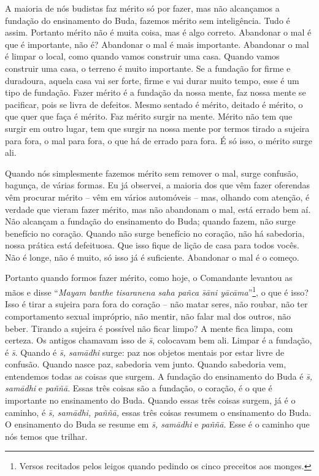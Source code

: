 A maioria de nós budistas faz mérito só por fazer, mas não
alcançamos a fundação do ensinamento do Buda, fazemos mérito sem
inteligência. Tudo é assim. Portanto mérito não é muita coisa, mas é
algo correto. Abandonar o mal é que é importante, não é? Abandonar o
mal é mais importante. Abandonar o mal é limpar o local, como quando
vamos construir uma casa. Quando vamos construir uma casa, o terreno é
muito importante. Se a fundação for firme e duradoura, aquela casa vai
ser forte, firme e vai durar muito tempo, esse é um tipo de fundação.
Fazer mérito é a fundação da nossa mente, faz nossa mente se pacificar,
pois se livra de defeitos. Mesmo sentado é mérito, deitado é mérito, o
que quer que faça é mérito. Faz mérito surgir na mente. Mérito não tem
que surgir em outro lugar, tem que surgir na nossa mente por termos
tirado a sujeira para fora, o mal para fora, o que há de errado para
fora. É só isso, o mérito surge ali. 

Quando nós simplesmente fazemos mérito sem remover o mal, surge
confusão, bagunça, de várias formas. Eu já observei, a maioria dos que
vêm fazer oferendas vêm procurar mérito – vêm em vários automóveis –
mas, olhando com atenção, é verdade que vieram fazer mérito, mas não
abandonam o mal, está errado bem aí. Não alcançam a fundação do
ensinamento do Buda; quando fazem, não surge benefício no coração.
Quando não surge benefício no coração, não há sabedoria, nossa prática
está defeituosa. Que isso fique de lição de casa para todos vocês. Não
é longe, não é muito, só isso já é suficiente. Abandonar o mal é o
começo.

Portanto quando formos fazer mérito, como hoje, o Comandante
levantou as mãos e disse “\textit{Mayam banthe tisaranena saha pañca
s\=\il\=ani y\=ac\=ama}”\footnote{Versos recitados pelos leigos quando
pedindo os cinco preceitos aos monges. }, o que é isso? Isso é tirar a
sujeira para fora do coração – não matar seres, não
roubar, não ter comportamento sexual impróprio, não mentir, não falar
mal dos outros, não beber. Tirando a sujeira é possível não ficar
limpo? A mente fica limpa, com certeza. Os antigos chamavam isso de
\textit{s\=\ila}, colocavam bem ali. Limpar é a fundação, é
\textit{s\=\ila}. Quando é \textit{s\=\ila, sam\=adhi} surge: paz nos
objetos mentais por estar livre de confusão. Quando nasce paz,
sabedoria vem junto. Quando sabedoria vem, entendemos todas as coisas
que surgem. A fundação do ensinamento do Buda é \textit{s\=\ila,
sam\=adhi }e\textit{ paññ\=a}. Essas três coisas são a fundação, o
coração, é o que é importante no ensinamento do Buda. Quando essas três
coisas surgem, já é o caminho, é \textit{s\=\ila, sam\=adhi, paññ\=a,}
essas três coisas resumem o ensinamento do Buda. O ensinamento do Buda
se resume em \textit{s\=\ila, sam\=adhi }e\textit{ paññ\=a.} Esse é o
caminho que nós temos que trilhar. 

